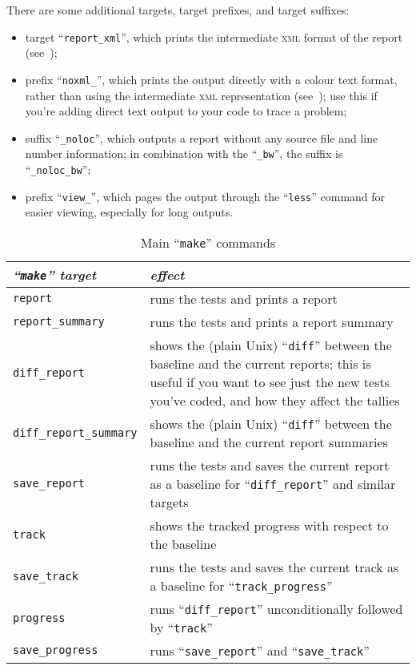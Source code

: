 \documentclass[twoside, a4paper, article]{memoir}
\begin{document}
There are some additional targets, target prefixes, and target suffixes:
\begin{itemize}
\item target ``\texttt{report\_xml}'', which prints the intermediate
  \textsc{xml} format of the report (see~);
\item prefix ``\texttt{noxml\_}'', which prints the output directly with a
  colour text format, rather than using the intermediate \textsc{xml}
  representation (see~); use this if you're
  adding direct text output to your code to trace a problem;
\item suffix ``\texttt{\_noloc}'', which outputs a report without any source
  file and line number information; in combination with the
  ``\texttt{\_bw}'', the suffix is ``\texttt{\_noloc\_bw}'';
\item prefix ``\texttt{view\_}'', which pages the output through the
  ``\texttt{less}'' command for easier viewing, especially for long outputs.
\end{itemize}

\begin{table}
  \centering
  \renewcommand\arraystretch{1.75}
  \begin{tabularx}{\linewidth}{lX}
    \toprule
    \emph{``\texttt{make}'' target} & \emph{effect} \\
    \midrule
    \texttt{report} & runs the tests and prints a report \\
    \texttt{report\_summary} & runs the tests and prints a report summary \\
    \texttt{diff\_report}
      & shows the (plain Unix) ``\texttt{diff}'' between the baseline and the
        current reports; this is useful if you want to see just the new tests
        you've coded, and how they affect the tallies \\
    \texttt{diff\_report\_summary}
      & shows the (plain Unix) ``\texttt{diff}'' between the baseline and the
        current report summaries \\
    \texttt{save\_report}
      & runs the tests and saves the current report as a baseline for
        ``\texttt{diff\_report}'' and similar targets \\
    \texttt{track} & shows the tracked progress with respect to the baseline \\
    \texttt{save\_track}
      & runs the tests and saves the current track as a baseline for
        ``\texttt{track\_progress}'' \\
    \texttt{progress}
      & runs ``\texttt{diff\_report}'' unconditionally followed by
        ``\texttt{track}'' \\
    \texttt{save\_progress}
      & runs ``\texttt{save\_report}'' and ``\texttt{save\_track}'' \\
    \bottomrule
  \end{tabularx}
  \caption{Main ``\texttt{make}'' commands}
  \label{tab:main-make-commands}
\end{table}
\end{document}
